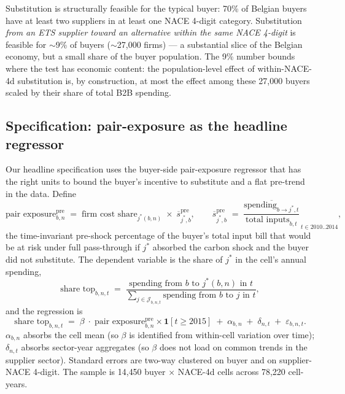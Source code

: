 Substitution is structurally feasible for the typical buyer: 70\% of Belgian buyers have at least two suppliers in at least one NACE 4-digit category. Substitution \emph{from an ETS supplier toward an alternative within the same NACE 4-digit} is feasible for $\sim$9\% of buyers ($\sim$27{,}000 firms) --- a substantial slice of the Belgian economy, but a small share of the buyer population. The 9\% number bounds where the test has economic content: the population-level effect of within-NACE-4d substitution is, by construction, at most the effect among these 27{,}000 buyers scaled by their share of total B2B spending.

\subsection{Specification: pair-exposure as the headline regressor}

Our headline specification uses the buyer-side pair-exposure regressor that has the right units to bound the buyer's incentive to substitute and a flat pre-trend in the data. Define
\begin{equation}
    \text{pair exposure}_{b,n}^{\text{pre}}
    \;=\; \text{firm cost share}_{j^*(b,n)} \;\times\; \overline{s}_{j^*,b}^{\text{pre}},
    \qquad
    \overline{s}_{j^*,b}^{\text{pre}}
    \;=\; \overline{
        \frac{\text{spending}_{b \to j^*,t}}{\text{total inputs}_{b,t}}
    }_{\,t \in 2010..2014},
    \label{eq:pair_exposure}
\end{equation}
the time-invariant pre-shock percentage of the buyer's total input bill that would be at risk under full pass-through if $j^*$ absorbed the carbon shock and the buyer did not substitute. The dependent variable is the share of $j^*$ in the cell's annual spending,
\begin{equation}
    \text{share top}_{b,n,t} \;=\; \frac{\text{spending from } b \text{ to } j^*(b,n) \text{ in } t}{\sum_{j \in \mathcal{J}_{b,n,t}} \text{spending from } b \text{ to } j \text{ in } t},
    \label{eq:share_top}
\end{equation}
and the regression is
\begin{equation}
    \text{share top}_{b,n,t} \;=\; \beta\;\cdot\;\text{pair exposure}_{b,n}^{\text{pre}} \times \mathbf{1}[t \geq 2015] \;+\; \alpha_{b,n} \;+\; \delta_{n,t} \;+\; \varepsilon_{b,n,t}.
    \label{eq:test_h_spec}
\end{equation}
$\alpha_{b,n}$ absorbs the cell mean (so $\beta$ is identified from within-cell variation over time); $\delta_{n,t}$ absorbs sector-year aggregates (so $\beta$ does not load on common trends in the supplier sector). Standard errors are two-way clustered on buyer and on supplier-NACE 4-digit. The sample is 14{,}450 buyer $\times$ NACE-4d cells across 78{,}220 cell-years.

